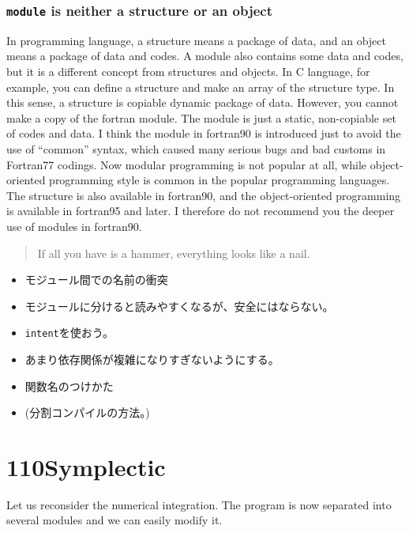 \documentclass[a4,10pt]{article}
\begin{document}
\subsubsection{{\tt module} is neither a structure or an object}
In programming language, a structure means a package of data, and an object means a package of data and codes.  A module also contains some data and codes, but it is a different concept from structures and objects.  In C language, for example, you can define a structure and make an array of the structure type.  In this sense, a structure is copiable dynamic package of data.  However, you cannot make a copy of the fortran module.  The module is just a static, non-copiable set of codes and data.  I think the module in fortran90 is introduced just to avoid the use of  ``common'' syntax, which caused many serious bugs and bad customs in Fortran77 codings.  Now modular programming is not popular at all, while object-oriented programming style is common in the popular programming languages.  The structure is also available in fortran90, and the object-oriented programming is available in fortran95 and later.  I therefore do not recommend you the deeper use of modules in fortran90.
\begin{quote}
If all you have is a hammer, everything looks like a nail.
\end{quote}


\begin{itemize}
\item モジュール間での名前の衝突
\item モジュールに分けると読みやすくなるが、安全にはならない。
\item {\tt intent}を使おう。
\item あまり依存関係が複雑になりすぎないようにする。
\item 関数名のつけかた
\item (分割コンパイルの方法。)
\end{itemize}



\section{110Symplectic}

Let us reconsider the numerical integration.  The program is now separated into several modules and we can easily modify it.
\end{document}
